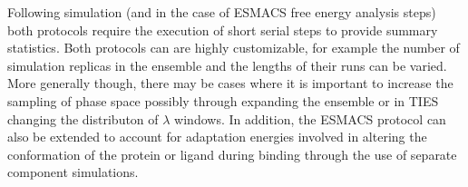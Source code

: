 Following simulation (and in the case of ESMACS free energy analysis steps) both protocols require
the execution of short serial steps to provide summary statistics.
Both protocols can are highly customizable, for example the number of simulation replicas in the 
ensemble and the lengths of their runs can be varied.
More generally though, there may be cases where it is important to increase the sampling of phase 
space possibly through expanding the ensemble or in TIES changing the distributon of $\lambda$ 
windows.
In addition, the ESMACS protocol can also be extended to account for adaptation energies involved 
in altering the conformation of the protein or ligand during binding through the use of separate 
component simulations.


